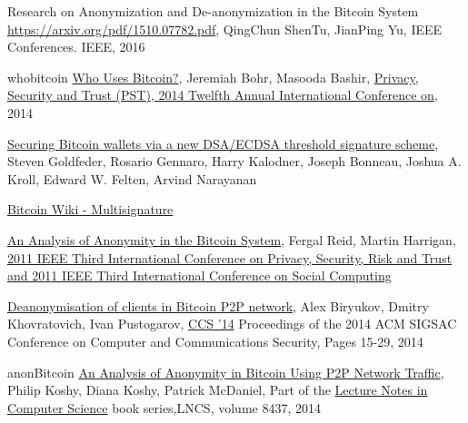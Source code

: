 %
%
%
\begin{thebibliography}{1}

Research on Anonymization and De-anonymization in the Bitcoin System
\url{https://arxiv.org/pdf/1510.07782.pdf}, QingChun ShenTu, JianPing Yu,
IEEE Conferences. IEEE, 2016

\item{whobitcoin}
\href{http://ieeexplore.ieee.org/abstract/document/6890928/}{Who Uses Bitcoin?},
Jeremiah Bohr, Masooda Bashir, 
\href{http://ieeexplore.ieee.org/xpl/mostRecentIssue.jsp?punumber=6883276}
{Privacy, Security and Trust (PST), 2014 Twelfth Annual International
Conference on}, 2014

\href{https://www.cs.princeton.edu/~stevenag/threshold_sigs.pdf}{Securing
Bitcoin wallets via a new DSA/ECDSA threshold signature scheme}, Steven
Goldfeder, Rosario Gennaro, Harry Kalodner, Joseph Bonneau, Joshua A. Kroll,
Edward W. Felten, Arvind Narayanan

\href{https://en.bitcoin.it/wiki/Multisignature#Multisignature_Applications}
{Bitcoin Wiki - Multisignature}

\href{http://ieeexplore.ieee.org/document/6113303/}{An Analysis of Anonymity in
the Bitcoin System}, Fergal Reid, Martin Harrigan,
\href{http://ieeexplore.ieee.org/xpl/mostRecentIssue.jsp?punumber=6112285}{2011
IEEE Third International Conference on Privacy, Security, Risk and Trust and
2011 IEEE Third International Conference on Social Computing}

\href{https://arxiv.org/pdf/1405.7418.pdf}{Deanonymisation of clients in
Bitcoin P2P network}, Alex Biryukov, Dmitry Khovratovich, Ivan Pustogarov,
\href{http://www.sigsac.org/ccs/CCS2014/}{CCS '14} Proceedings of the 2014 ACM
SIGSAC Conference on Computer and Communications Security, Pages 15-29, 2014

\item{anonBitcoin}
\href{https://www.ifca.ai/fc14/papers/fc14_submission_71.pdf}{An Analysis of
Anonymity in Bitcoin Using P2P Network Traffic}, Philip Koshy, Diana Koshy,
Patrick McDaniel, Part of the \href{https://link.springer.com/bookseries/558}
{Lecture Notes in Computer Science} book series,LNCS, volume 8437, 2014


\end{thebibliography}
